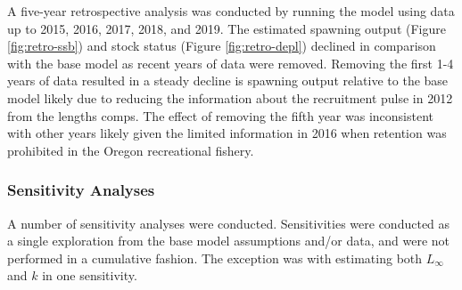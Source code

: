 \documentclass[11pt,
  english,
  a4paper,
]{article}
\begin{document}
\leavevmode\tagmcend\tagstructend


A five-year retrospective analysis was conducted by running the model using data up to 2015, 2016, 2017, 2018, and 2019. The estimated spawning output (Figure \ref{fig:retro-ssb}) and stock status (Figure \ref{fig:retro-depl}) declined in comparison with the base model as recent years of data were removed. Removing the first 1-4 years of data resulted in a steady decline is spawning output relative to the base model likely due to reducing the information about the recruitment pulse in 2012 from the lengths comps. The effect of removing the fifth year was inconsistent with other years likely given the limited information in 2016 when retention was prohibited in the Oregon recreational fishery.

\leavevmode\tagmcend\tagstructend\par


\hypertarget{sensitivity-analyses}{%
\subsubsection{Sensitivity Analyses}\label{sensitivity-analyses}}

\leavevmode\tagmcend\tagstructend


A number of sensitivity analyses were conducted. Sensitivities were conducted as a single exploration from the base model assumptions and/or data, and were not performed in a cumulative fashion. The exception was with estimating both {\(L_{\infty}\)\leavevmode\tagmcend\tagstructend} and {\(k\)\leavevmode\tagmcend\tagstructend} in one sensitivity.

\leavevmode\tagmcend\tagstructend\par
\end{document}
